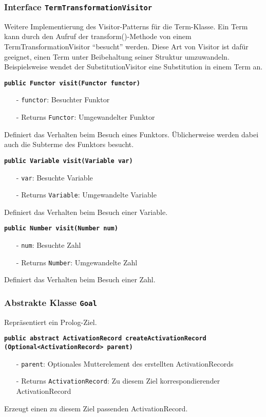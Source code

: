 \documentclass[parskip=full,11pt,twoside]{scrartcl}
\begin{document}
\subsubsection{Interface \texttt{TermTransformationVisitor}}
Weitere Implementierung des Visitor-Patterns für die Term-Klasse. Ein Term kann durch den Aufruf der transform()-Methode von einem TermTransformationVisitor \enquote{besucht} werden. Diese Art von Visitor ist dafür geeignet, einen Term unter Beibehaltung seiner Struktur umzuwandeln. Beispielsweise wendet der SubstitutionVisitor eine Substitution in einem Term an.

\textbf{\texttt{public Functor visit(Functor functor)}}
\begin{itemize}[noitemsep]
	\item[-] \texttt{functor}: Besuchter Funktor
	\item[-] Returns \texttt{Functor}: Umgewandelter Funktor
\end{itemize}
Definiert das Verhalten beim Besuch eines Funktors. Üblicherweise werden dabei auch die Subterme des Funktors besucht.

\textbf{\texttt{public Variable visit(Variable var)}}
\begin{itemize}[noitemsep]
	\item[-] \texttt{var}: Besuchte Variable
	\item[-] Returns \texttt{Variable}: Umgewandelte Variable
\end{itemize}
Definiert das Verhalten beim Besuch einer Variable.

\textbf{\texttt{public Number visit(Number num)}}
\begin{itemize}[noitemsep]
	\item[-] \texttt{num}: Besuchte Zahl
	\item[-] Returns \texttt{Number}: Umgewandelte Zahl
\end{itemize}
Definiert das Verhalten beim Besuch einer Zahl.

\subsubsection{Abstrakte Klasse \texttt{Goal}}

Repräsentiert ein Prolog-Ziel.

\textbf{\texttt{public abstract ActivationRecord createActivationRecord\\(Optional<ActivationRecord> parent)}}
\begin{itemize}[noitemsep]
	\item[-] \texttt{parent}: Optionales Mutterelement des erstellten ActivationRecords
	\item[-] Returns \texttt{ActivationRecord}: Zu diesem Ziel korrespondierender ActivationRecord
\end{itemize}
Erzeugt einen zu diesem Ziel passenden ActivationRecord.
\end{document}
